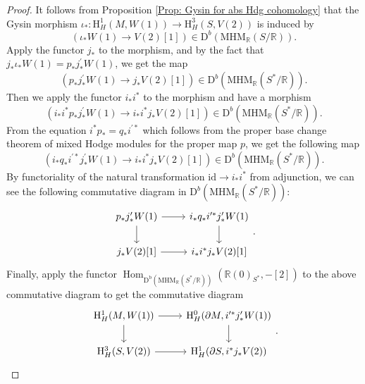 \documentclass[11pt, a4paper]{amsart}
\theoremstyle{plain}
\theoremstyle{definition}
\numberwithin{equation}{section}
\def\RR{\mathbb{R}}
\DeclareMathOperator{\Hom}{Hom}
\begin{document}
\begin{proof}
It follows from Proposition \ref{Prop: Gysin for abs Hdg cohomology} that the Gysin morphism $\iota_{*} \colon \mathrm{H}^{1}_{H}(M,W(1)) \rightarrow \mathrm{H}^{3}_{H}(S, V(2))$ is induced by 
\begin{equation*}
    (\iota_{*}W(1) \rightarrow V(2)[1]) \in \mathrm{D}^{b}(\mathrm{MHM}_{\RR}(S/\RR)). 
\end{equation*}
Apply the functor $j_{*}$ to the morphism, and by the fact that $j_{*}\iota_{*}W(1) = p_{*}j^{\prime}_{*}W(1)$, we get the map
\begin{equation*}
    (p_{*}j^{\prime}_{*}W(1) \rightarrow j_{*}V(2)[1]) \in \mathrm{D}^{b}(\mathrm{MHM}_{\RR}(S^{*}/\RR)). 
\end{equation*}
Then we apply the functor $i_{*}i^{*}$ to the morphism and have a morphism 
\begin{equation*}
    (i_{*}i^{*}p_{*}j^{\prime}_{*}W(1) \rightarrow i_{*}i^{*}j_{*}V(2)[1]) \in \mathrm{D}^{b}(\mathrm{MHM}_{\RR}(S^{*}/\RR)). 
\end{equation*}
From the equation $i^{*}p_{*} = q_{*}i^{\prime*}$ which follows from the proper base change theorem of mixed Hodge modules for the proper map $p$, we get the following map 
\begin{equation*}
    (i_{*}q_{*}i^{\prime*}j^{\prime}_{*}W(1) \rightarrow i_{*}i^{*}j_{*}V(2)[1]) \in \mathrm{D}^{b}(\mathrm{MHM}_{\RR}(S^{*}/\RR)). 
\end{equation*}
By functoriality of the natural transformation $\mathrm{id} \rightarrow i_{*}i^{*}$ from adjunction, we can see the following commutative diagram in $\mathrm{D}^{b}(\mathrm{MHM}_{\RR}(S^{*}/\RR))$: 
\[
    \begin{tikzcd}
        p_{*}j^{\prime}_{*}W(1) \ar[r] \ar[d] & i_{*}q_{*}i^{\prime*}j^{\prime}_{*}W(1) \ar[d] \\
        j_{*}V(2)[1] \ar[r] & i_{*}i^{*}j_{*}V(2)[1]
    \end{tikzcd}. 
\]
Finally, apply the functor $\Hom_{\mathrm{D}^{\mathrm{b}}(\mathrm{MHM}_{\RR}(S^{*}/\RR))}(\RR(0)_{S^{*}}, -[2])$ to the above  commutative diagram to get the commutative diagram 
\begin{equation*}
    \begin{tikzcd}
        \mathrm{H}^{1}_{H}(M, W(1)) \ar[r] \ar[d] & \mathrm{H}^{0}_{H}(\partial M, i^{\prime*}j^{\prime }_{*}W(1))  \ar[d] \\
        \mathrm{H}^{3}_{H}(S, V(2)) \ar[r] & \mathrm{H}^{1}_{H}(\partial S, i^{*}j_{*}V(2))
    \end{tikzcd}.
\end{equation*}
\end{proof}
\end{document}
